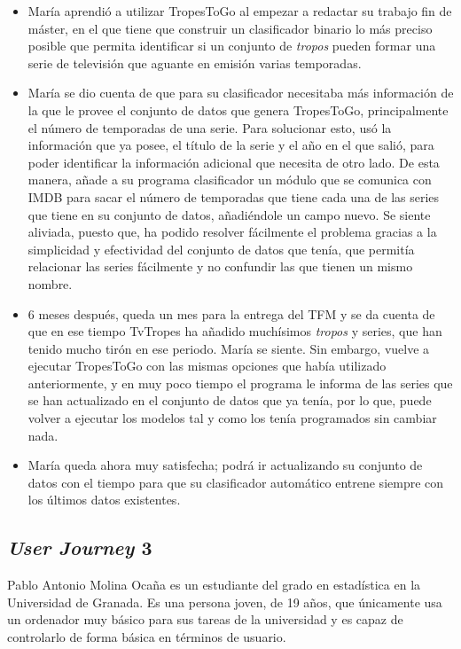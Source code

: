 \begin{itemize}
    \item María aprendió a utilizar TropesToGo al empezar a redactar su trabajo
    fin de máster, en el que tiene que construir un clasificador binario lo más
    preciso posible que permita identificar si un conjunto de \textit{tropos}
    pueden formar una serie de televisión que aguante en emisión varias
    temporadas.
    \item María se dio cuenta de que para su clasificador necesitaba más
    información de la que le provee el conjunto de datos que genera TropesToGo,
    principalmente el número de temporadas de una serie. Para solucionar esto,
    usó la información que ya posee, el título de la serie y el año en el que
    salió, para poder identificar la información adicional que necesita de otro
    lado. De esta manera, añade a su programa clasificador un módulo que se
    comunica con IMDB para sacar el número de temporadas que tiene cada una de
    las series que tiene en su conjunto de datos, añadiéndole un campo nuevo. Se
    siente aliviada, puesto que, ha podido resolver fácilmente el problema
    gracias a la simplicidad y efectividad del conjunto de datos que tenía, que
    permitía relacionar las series fácilmente y no confundir las que tienen un
    mismo nombre.
    \item 6 meses después, queda un mes para la entrega del TFM y se da cuenta
    de que en ese tiempo TvTropes ha añadido muchísimos \textit{tropos} y
    series, que han tenido mucho tirón en ese periodo. María se siente. Sin
    embargo, vuelve a ejecutar TropesToGo con las mismas opciones que había
    utilizado anteriormente, y en muy poco tiempo el programa le informa de las
    series que se han actualizado en el conjunto de datos que ya tenía, por lo
    que, puede volver a ejecutar los modelos tal y como los tenía programados
    sin cambiar nada.
    \item María queda ahora muy satisfecha; podrá ir actualizando su conjunto de
    datos con el tiempo para que su clasificador automático entrene siempre con
    los últimos datos existentes.
\end{itemize}

\subsection{\textit{User Journey} 3} 

Pablo Antonio Molina Ocaña es un estudiante del grado en estadística en la
Universidad de Granada. Es una persona joven, de 19 años, que únicamente usa un
ordenador muy básico para sus tareas de la universidad y es capaz de controlarlo
de forma básica en términos de usuario.

